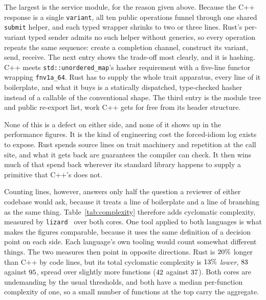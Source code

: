 \documentclass[english,oneside,a4paper,censored,csm,software-track-2020]{HYthesisML}
\begin{document}
The largest is the service module, for the reason given above. Because the C++ response is a
single \texttt{variant}, all ten public operations funnel through one shared \texttt{submit}
helper, and each typed wrapper shrinks to two or three lines. Rust's per-variant typed
sender admits no such helper without generics, so every operation repeats the same sequence:
create a completion channel, construct its variant, send, receive. The next entry shows the
trade-off most clearly, and it is hashing. C++ meets
\texttt{std::unordered\_map}'s hasher requirement with a five-line functor wrapping
\texttt{fnv1a\_64}. Rust has to supply the whole trait apparatus, every line of it
boilerplate, and what it buys is a statically dispatched, type-checked hasher instead of a
callable of the conventional shape. The third entry is the module tree and public re-export
list, work C++ gets for free from its header structure.

None of this is a defect on either side, and none of it shows up in the performance figures.
It is the kind of engineering cost the forced-idiom log exists to expose. Rust spends source
lines on trait machinery and repetition at the call site, and what it gets back are guarantees
the compiler can check. It then wins much of that spend back wherever its standard library
happens to supply a primitive that C++'s does not.

Counting lines, however, answers only half the question a reviewer of either codebase would
ask, because it treats a line of boilerplate and a line of branching as the same thing.
Table~\ref{tab:complexity} therefore adds cyclomatic complexity, measured by
\texttt{lizard}~\cite{lizard} over both cores. One tool applied to both languages is what makes
the figures comparable, because it uses the same definition of a decision point on each side.
Each language's own tooling would count somewhat different things. The two measures then
point in opposite directions. Rust is $20\%$ longer than C++ by code lines, but its
total cyclomatic complexity is $13\%$ \emph{lower}, $83$ against
$95$, spread over slightly more functions ($42$ against $37$). Both
cores are undemanding by the usual thresholds, and both have a median per-function complexity
of one, so a small number of functions at the top carry the aggregate.
\end{document}
